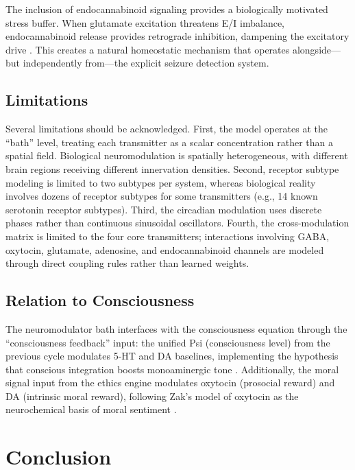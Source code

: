 \documentclass[11pt,a4paper]{article}
\begin{document}
The inclusion of endocannabinoid signaling provides a biologically motivated stress buffer. When glutamate excitation threatens E/I imbalance, endocannabinoid release provides retrograde inhibition, dampening the excitatory drive \citep{piomelli2003}. This creates a natural homeostatic mechanism that operates alongside---but independently from---the explicit seizure detection system.

\subsection{Limitations}

Several limitations should be acknowledged. First, the model operates at the ``bath'' level, treating each transmitter as a scalar concentration rather than a spatial field. Biological neuromodulation is spatially heterogeneous, with different brain regions receiving different innervation densities. Second, receptor subtype modeling is limited to two subtypes per system, whereas biological reality involves dozens of receptor subtypes for some transmitters (e.g., 14 known serotonin receptor subtypes). Third, the circadian modulation uses discrete phases rather than continuous sinusoidal oscillators. Fourth, the cross-modulation matrix is limited to the four core transmitters; interactions involving GABA, oxytocin, glutamate, adenosine, and endocannabinoid channels are modeled through direct coupling rules rather than learned weights.

\subsection{Relation to Consciousness}

The neuromodulator bath interfaces with the consciousness equation through the ``consciousness feedback'' input: the unified Psi (consciousness level) from the previous cycle modulates 5-HT and DA baselines, implementing the hypothesis that conscious integration boosts monoaminergic tone \citep{dehaene2006}. Additionally, the moral signal input from the ethics engine modulates oxytocin (prosocial reward) and DA (intrinsic moral reward), following Zak's model of oxytocin as the neurochemical basis of moral sentiment \citep{zak2012}.

\section{Conclusion}
\end{document}
